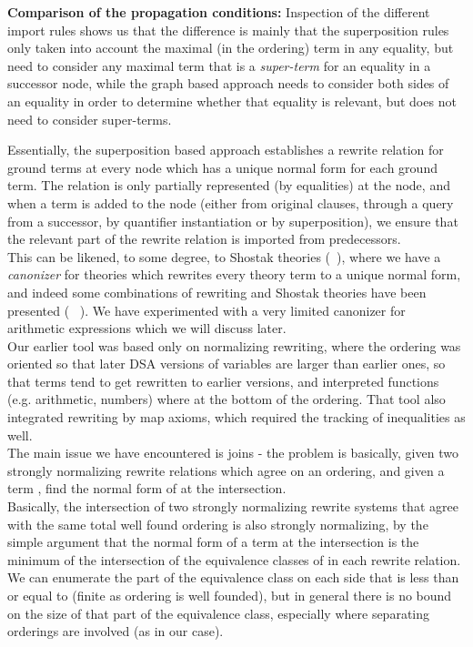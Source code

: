\noindent
\textbf{Comparison of the propagation conditions:}
Inspection of the different import rules shows us that the difference is mainly that the superposition rules only taken into account the maximal (in the ordering) term in any equality, but need to consider any maximal term that is a \emph{super-term} for an equality in a successor node, while the graph based approach needs to consider both sides of an equality in order to determine whether that equality is relevant, but does not need to consider super-terms.

Essentially, the superposition based approach establishes a rewrite relation for ground terms at every node which has a unique normal form for each ground term. The relation is only partially represented (by equalities) at the node, and when a term is added to the node (either from original clauses, through a query from a successor, by quantifier instantiation or by superposition), we ensure that the relevant part of the rewrite relation is imported from predecessors.\\
This can be likened, to some degree, to Shostak theories (~\cite{Shostak84}), where we have a \emph{canonizer} for theories which rewrites every theory term to a unique normal form, and indeed some combinations of rewriting and Shostak theories have been presented (~\cite{SuperpositionModuloShostak} ). We have experimented with a very limited canonizer for arithmetic expressions which we will discuss later.\\
Our earlier tool was based only on normalizing rewriting, where the ordering was oriented so that later DSA versions of variables are larger than earlier ones, so that terms tend to get rewritten to earlier versions, and interpreted functions (e.g. arithmetic, numbers) where at the bottom of the ordering. That tool also integrated rewriting by map axioms, which required the tracking of inequalities as well.\\
The main issue we have encountered is joins - the problem is basically, given two strongly normalizing rewrite relations which agree on an ordering, and given a term , find the normal form of  at the intersection. \\
Basically, the intersection of two strongly normalizing rewrite systems that agree with the same total well found ordering is also strongly normalizing, by the simple argument that the normal form of a term  at the intersection is the minimum of the intersection of the equivalence classes of  in each rewrite relation. We can enumerate the part of the equivalence class on each side that is less than or equal to  (finite as ordering is well founded), but in general there is no bound on the size of that part of the equivalence class, especially where separating orderings are involved (as in our case).

